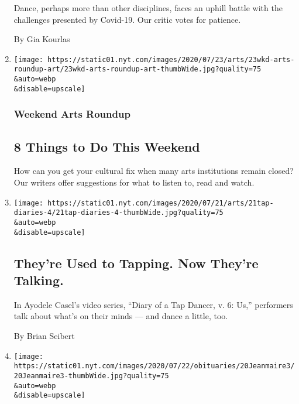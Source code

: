 \begin{enumerate}
  Dance, perhaps more than other disciplines, faces an uphill battle
  with the challenges presented by Covid-19. Our critic votes for
  patience.

  By Gia Kourlas
\item
  \href{/2020/07/23/arts/things-to-do-weekend-coronavirus.html}{}

  \texttt{[image: https://static01.nyt.com/images/2020/07/23/arts/23wkd-arts-roundup-art/23wkd-arts-roundup-art-thumbWide.jpg?quality=75\\\&auto=webp\\\&disable=upscale]}

  \hypertarget{weekend-arts-roundup}{%
  \subsubsection{Weekend Arts Roundup}\label{weekend-arts-roundup}}

  \hypertarget{8-things-to-do-this-weekend}{%
  \subsection{8 Things to Do This
  Weekend}\label{8-things-to-do-this-weekend}}

  How can you get your cultural fix when many arts institutions remain
  closed? Our writers offer suggestions for what to listen to, read and
  watch.
\item
  \href{/2020/07/21/arts/dance/ayodele-casel-diary-of-a-tap-dancer.html}{}

  \texttt{[image: https://static01.nyt.com/images/2020/07/21/arts/21tap-diaries-4/21tap-diaries-4-thumbWide.jpg?quality=75\\\&auto=webp\\\&disable=upscale]}

  \hypertarget{theyre-used-to-tapping-now-theyre-talking}{%
  \subsection{They're Used to Tapping. Now They're
  Talking.}\label{theyre-used-to-tapping-now-theyre-talking}}

  In Ayodele Casel's video series, ``Diary of a Tap Dancer, v. 6: Us,''
  performers talk about what's on their minds --- and dance a little,
  too.

  By Brian Seibert
\item
  \href{/2020/07/21/arts/dance/zizi-jeanmaire-french-star-of-ballet-cabaret-and-film-dies-at-96.html}{}

  \texttt{[image: https://static01.nyt.com/images/2020/07/22/obituaries/20Jeanmaire3/20Jeanmaire3-thumbWide.jpg?quality=75\\\&auto=webp\\\&disable=upscale]}


\end{enumerate}
